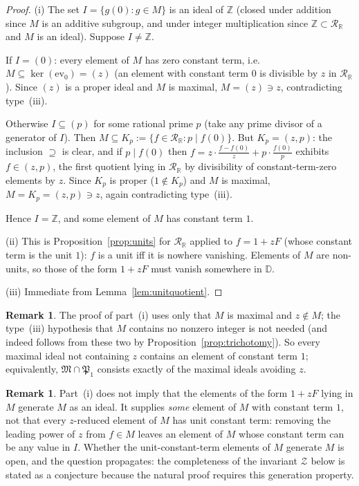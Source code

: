 \documentclass[12pt]{amsart}
\theoremstyle{definition}
\newtheorem{remark}[theorem]{Remark}
\newcommand{\D}{\mathbb{D}}
\newcommand{\Z}{\mathbb{Z}}
\newcommand{\mRR}{\mathcal{R}_{\mathbb{R}}}
\begin{document}
\begin{proof}
(i) The set $I = \{g(0) : g \in M\}$ is an ideal of $\Z$ (closed under
addition since $M$ is an additive subgroup, and under integer
multiplication since $\Z \subset \mRR$ and $M$ is an ideal).  Suppose $I
\neq \Z$.

If $I = (0)$: every element of $M$ has zero constant term, i.e.\ $M
\subseteq \ker(\mathrm{ev}_0) = (z)$ (an element with constant term $0$
is divisible by $z$ in $\mRR$).  Since $(z)$ is a proper ideal and $M$ is
maximal, $M = (z) \ni z$, contradicting type~(iii).

Otherwise $I \subseteq (p)$ for some rational prime $p$ (take any prime
divisor of a generator of $I$).  Then $M \subseteq K_p := \{f \in \mRR :
p \mid f(0)\}$.  But $K_p = (z, p)$: the inclusion $\supseteq$ is clear,
and if $p \mid f(0)$ then $f = z \cdot \tfrac{f - f(0)}{z} + p \cdot
\tfrac{f(0)}{p}$ exhibits $f \in (z,p)$, the first quotient lying in
$\mRR$ by divisibility of constant-term-zero elements by $z$.  Since
$K_p$ is proper ($1 \notin K_p$) and $M$ is maximal, $M = K_p = (z,p)
\ni z$, again contradicting type~(iii).

Hence $I = \Z$, and some element of $M$ has constant term $1$.

(ii) This is Proposition~\ref{prop:units} for $\mRR$ applied to $f = 1 +
zF$ (whose constant term is the unit $1$): $f$ is a unit iff it is
nowhere vanishing.  Elements of $M$ are non-units, so those of the form
$1 + zF$ must vanish somewhere in $\D$.

(iii) Immediate from Lemma~\ref{lem:unitquotient}.
\end{proof}

\begin{remark}
\label{rem:onlymax}
The proof of part~(i) uses only that $M$ is maximal and $z \notin M$; the
type~(iii) hypothesis that $M$ contains no nonzero integer is not needed
(and indeed follows from these two by
Proposition~\ref{prop:trichotomy}).  So every maximal ideal not
containing $z$ contains an element of constant term $1$; equivalently,
$\mathfrak{M} \cap \mathfrak{P}_1$ consists exactly of the maximal ideals
avoiding $z$.
\end{remark}

\begin{remark}
\label{rem:nogeneration}
Part~(i) does not imply that the elements of the form $1 + zF$ lying in
$M$ generate $M$ as an ideal.  It supplies \emph{some} element of $M$
with constant term $1$, not that every $z$-reduced element of $M$ has
unit constant term: removing the leading power of $z$ from $f \in M$
leaves an element of $M$ whose constant term can be any value in $I$.
Whether the unit-constant-term elements of $M$ generate $M$ is open, and
the question propagates: the completeness of the invariant $\mathcal{Z}$
below is stated as a conjecture because the natural proof requires this
generation property.
\end{remark}
\end{document}
